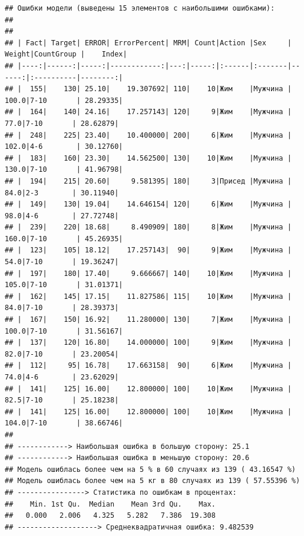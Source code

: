 \documentclass[
]{article}
\newenvironment{Shaded}{\begin{snugshade}}{\end{snugshade}}
\newcommand{\CommentTok}[1]{\textcolor[rgb]{0.56,0.35,0.01}{\textit{#1}}}
\newcommand{\DecValTok}[1]{\textcolor[rgb]{0.00,0.00,0.81}{#1}}
\newcommand{\KeywordTok}[1]{\textcolor[rgb]{0.13,0.29,0.53}{\textbf{#1}}}
\newcommand{\NormalTok}[1]{#1}
\newcommand{\OperatorTok}[1]{\textcolor[rgb]{0.81,0.36,0.00}{\textbf{#1}}}
\newcommand{\StringTok}[1]{\textcolor[rgb]{0.31,0.60,0.02}{#1}}
\begin{document}
\begin{verbatim}
## Ошибки модели (выведены 15 элементов с наибольшими ошибками): 
## 
## 
## | Fact| Target| ERROR| ErrorPercent| MRM| Count|Action |Sex     | Weight|CountGroup |    Index|
## |----:|------:|-----:|------------:|---:|-----:|:------|:-------|------:|:----------|--------:|
## |  155|    130| 25.10|    19.307692| 110|    10|Жим    |Мужчина |  100.0|7-10       | 28.29335|
## |  164|    140| 24.16|    17.257143| 120|     9|Жим    |Мужчина |   77.0|7-10       | 28.62879|
## |  248|    225| 23.40|    10.400000| 200|     6|Жим    |Мужчина |  102.0|4-6        | 30.12760|
## |  183|    160| 23.30|    14.562500| 130|    10|Жим    |Мужчина |  130.0|7-10       | 41.96798|
## |  194|    215| 20.60|     9.581395| 180|     3|Присед |Мужчина |   84.0|2-3        | 30.11940|
## |  149|    130| 19.04|    14.646154| 120|     6|Жим    |Мужчина |   98.0|4-6        | 27.72748|
## |  239|    220| 18.68|     8.490909| 180|     8|Жим    |Мужчина |  160.0|7-10       | 45.26935|
## |  123|    105| 18.12|    17.257143|  90|     9|Жим    |Мужчина |   54.0|7-10       | 19.36247|
## |  197|    180| 17.40|     9.666667| 140|    10|Жим    |Мужчина |  105.0|7-10       | 31.01371|
## |  162|    145| 17.15|    11.827586| 115|    10|Жим    |Мужчина |   84.0|7-10       | 28.39373|
## |  167|    150| 16.92|    11.280000| 130|     7|Жим    |Мужчина |  100.0|7-10       | 31.56167|
## |  137|    120| 16.80|    14.000000| 100|     9|Жим    |Мужчина |   82.0|7-10       | 23.20054|
## |  112|     95| 16.78|    17.663158|  90|     6|Жим    |Мужчина |   74.0|4-6        | 23.62029|
## |  141|    125| 16.00|    12.800000| 100|    10|Жим    |Мужчина |   82.5|7-10       | 25.18238|
## |  141|    125| 16.00|    12.800000| 100|    10|Жим    |Мужчина |  104.0|7-10       | 38.66746|
## 
## ------------> Наибольшая ошибка в большую сторону: 25.1 
## ------------> Наибольшая ошибка в меньшую сторону: 20.6 
## Модель ошиблась более чем на 5 % в 60 случаях из 139 ( 43.16547 %)
## Модель ошиблась более чем на 5 кг в 80 случаях из 139 ( 57.55396 %)
## ----------------> Статистика по ошибкам в процентах:
##    Min. 1st Qu.  Median    Mean 3rd Qu.    Max. 
##   0.000   2.006   4.325   5.282   7.386  19.308 
## -------------------> Среднеквадратичная ошибка: 9.482539
\end{verbatim}

\begin{Shaded}
\end{Shaded}
\end{document}
